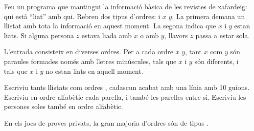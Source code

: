 

\Statement

Feu un programa que mantingui la informació bàsica
de les revistes de xafardeig: qui està ``liat'' amb qui.
Rebreu dos tipus d'ordres:  i  $x$ $y$.
La primera demana un llistat amb tota la informació en aquest moment.
La segona indica que $x$ i $y$ estan liats.
Si alguna persona $z$ estava liada amb $x$ o amb $y$,
llavors $z$ passa a estar sola.


\Input

L'entrada consisteix en diverses ordres.
Per a cada ordre  $x$ $y$,
tant $x$ com $y$ són paraules formades només amb lletres minúscules,
tals que $x$ i $y$ són diferents,
i tals que $x$ i $y$ no estan liats en aquell moment.


\Output

Escriviu tants llistats com ordres ,
cadascun acabat amb una línia amb 10 guions.
Escriviu en ordre alfabètic cada parella, i també les parelles entre si.
Escriviu les persones soles també en ordre alfabètic.


\Observation

En els jocs de proves privats,
la gran majoria d'ordres són de tipus .


\clearpage

\Sample
